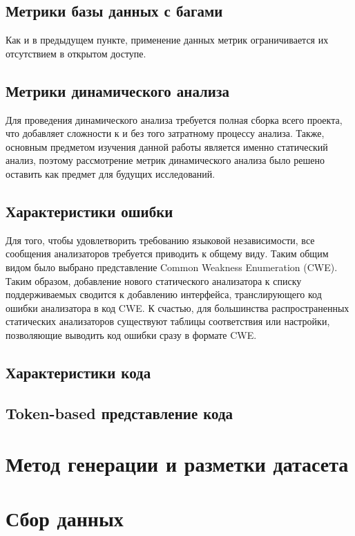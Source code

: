 \subsection{Метрики базы данных с багами}
Как и в предыдущем пункте, применение данных метрик ограничивается их отсутствием в открытом доступе.

\subsection{Метрики динамического анализа}
Для проведения динамического анализа требуется полная сборка всего проекта, что добавляет сложности к и без того затратному процессу анализа. Также, основным предметом изучения данной работы является именно статический анализ, поэтому рассмотрение метрик динамического анализа было решено оставить как предмет для будущих исследований.

\subsection{Характеристики ошибки}
\label{sec:Err-to-CWE} 
Для того, чтобы удовлетворить требованию языковой независимости, все сообщения анализаторов требуется приводить к общему виду. Таким общим видом было выбрано представление Common Weakness Enumeration (CWE)\cite{CWE-doc}. Таким образом, добавление нового статического анализатора к списку поддерживаемых сводится к добавлению интерфейса, транслирующего код ошибки анализатора в код CWE. К счастью, для большинства распространенных статических анализаторов существуют таблицы соответствия или настройки, позволяющие выводить код ошибки сразу в формате CWE.

\subsection{Характеристики кода}

\subsection{Token-based представление кода}
\label{sec:Tokens} 

\section{Метод генерации и разметки датасета}

\section{Сбор данных}

